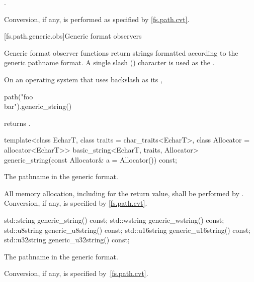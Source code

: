 \begin{itemdescr}
\pnum
\returns
{}.

\pnum
\remarks
Conversion, if any, is performed as specified
by \ref{fs.path.cvt}.
\end{itemdescr}


[fs.path.generic.obs]{Generic format observers}

\pnum
Generic format observer functions return strings formatted according to the
generic pathname format.
A single slash () character is used as
the .

\pnum
\begin{example}
On an operating system that uses backslash as
its ,
\begin{codeblock}
path("foo\\bar").generic_string()
\end{codeblock}
returns .
\end{example}

%
\begin{itemdecl}
template<class EcharT, class traits = char_traits<EcharT>,
         class Allocator = allocator<EcharT>>
  basic_string<EcharT, traits, Allocator>
    generic_string(const Allocator& a = Allocator()) const;
\end{itemdecl}

\begin{itemdescr}
\pnum
\returns
The pathname in the generic format.

\pnum
\remarks
All memory allocation, including for the return value, shall
be performed by . Conversion, if any, is specified by
\ref{fs.path.cvt}.
\end{itemdescr}

%
%
%
%
%
\begin{itemdecl}
std::string generic_string() const;
std::wstring generic_wstring() const;
std::u8string generic_u8string() const;
std::u16string generic_u16string() const;
std::u32string generic_u32string() const;
\end{itemdecl}

\begin{itemdescr}
\pnum
\returns
The pathname in the generic format.

\pnum
\remarks
Conversion, if any, is specified by~\ref{fs.path.cvt}.
\end{itemdescr}

